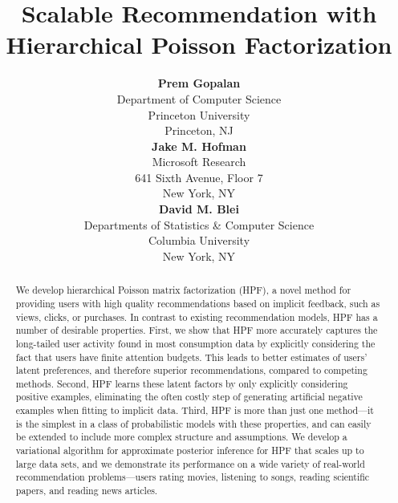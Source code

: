 \documentclass[]{article}
\title{Scalable Recommendation with Hierarchical Poisson
  Factorization}
\author{ {\bf Prem Gopalan} \\
Department of Computer Science \\
Princeton University \\
Princeton, NJ \\
\And
{\bf Jake M. Hofman} \\
Microsoft Research \\
641 Sixth Avenue, Floor 7 \\
New York, NY \\
\And
{\bf David M. Blei} \\
Departments of Statistics \& Computer Science \\
Columbia University \\
New York, NY \\
}
\begin{document}
\maketitle

\begin{abstract}
We develop hierarchical Poisson matrix factorization (HPF), a novel
method for providing users with high quality recommendations based on
implicit feedback, such as views, clicks, or purchases.  In contrast
to existing recommendation models, HPF has a number of desirable
properties.  First, we show that HPF more accurately captures the
long-tailed user activity found in most consumption data by explicitly
considering the fact that users have finite attention budgets.  This
leads to better estimates of users' latent preferences, and therefore
superior recommendations, compared to competing methods.  Second, HPF
learns these latent factors by only explicitly considering positive
examples, eliminating the often costly step of generating artificial
negative examples when fitting to implicit data.  Third, HPF is more
than just one method---it is the simplest in a class of probabilistic
models with these properties, and can easily be extended to include
more complex structure and assumptions.  We develop a variational
algorithm for approximate posterior inference for HPF that scales up
to large data sets, and we demonstrate its performance on a wide
variety of real-world recommendation problems---users rating movies,
listening to songs, reading scientific papers, and reading news
articles.  
\end{abstract}








\small{
  
  
}

\end{document}
